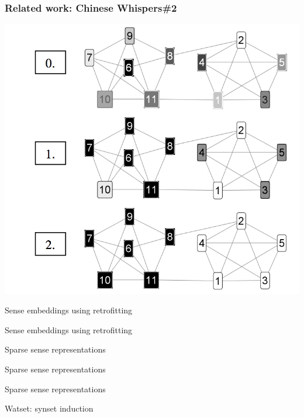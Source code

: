 \documentclass{beamer}
\begin{document}
\begin{frame}[fragile]
\frametitle{Related work: Chinese Whispers\#2}
\begin{center}
 \includegraphics[height=0.59\textwidth]{cw2}
 
 \end{center}
\end{frame}



\begin{frame}{Sense embeddings using retrofitting}
	
\end{frame}

\begin{frame}{Sense embeddings using retrofitting}
	
\end{frame}



\begin{frame}{Sparse sense representations}
	
\end{frame}


\begin{frame}{Sparse sense representations}
	
\end{frame}


\begin{frame}{Sparse sense representations}
	
\end{frame}

\begin{frame}{Watset: synset induction}
	
\end{frame}
\end{document}

